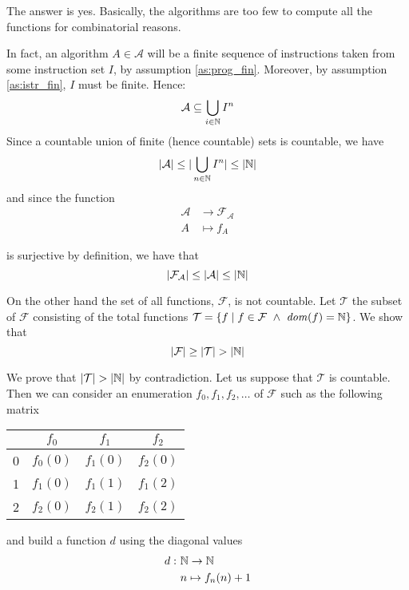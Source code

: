 The answer is yes. Basically, the algorithms are too few to compute all the
functions for combinatorial reasons.

In fact, an algorithm $A \in \mathcal{A}$ will be a finite sequence of instructions taken from
some instruction set $I$, by
assumption \ref{as:prog_fin}. Moreover, by assumption \ref{as:istr_fin},
$I$ must be finite. Hence:
\begin{equation*}
  \mathcal{A} \subseteq \bigcup_{i \in \mathbb{N}} I^n
\end{equation*}
Since a countable union of finite (hence countable) sets is countable, we have
\begin{equation*}
  |\mathcal{A}| \leq |\bigcup_{n\in\mathbb{N}} I^n| \leq |\mathbb{N}|
\end{equation*}
and since the function
\begin{align*}
  \mathcal{A} & \to \mathcal{F}_\mathcal{A}\\
  A & \mapsto f_A
\end{align*}

is surjective by definition, we have that
\begin{equation*}
    |\mathcal{F}_\mathcal{A}| \leq |\mathcal{A}| \leq |\mathbb{N}|
\end{equation*}

On the other hand the set of all functions, $\mathcal{F}$, is not countable. Let $\mathcal{T}$ the subset of $\mathcal{F}$ consisting of the total functions $\mathcal{T} = \{ f \mid f \in \mathcal{F}\ \land\ \mathit{dom}({f}) = \mathbb{N}\}$. We show that
\begin{equation*}
  |\mathcal{F}| \geq |\mathcal{T}| > |\mathbb{N}|
\end{equation*}

We prove that $|\mathcal{T}| > |\mathbb{N}|$ by contradiction. Let us suppose that $\mathcal{T}$ is countable. 
Then we can consider an enumeration $f_0, f_1, f_2, \ldots$ of $\mathcal{F}$ such as the following matrix
\begin{center}
  \begin{tabular}{c|ccc}
    & $f_0$    & $f_1$    & $f_2$\\
    \hline
    0 & $f_0(0)$ & $f_1(0)$ & $f_2(0)$ \\
    1 & $f_1(0)$ & $f_1(1)$ & $f_1(2)$ \\
    2 & $f_2(0)$ & $f_2(1)$ & $f_2(2)$
  \end{tabular}
\end{center}
and build a function $d$ using the diagonal values 
\begin{align*}
  d :\ & \mathbb{N} \to \mathbb{N}\\
  & n \mapsto f_n(n)+1
\end{align*}

